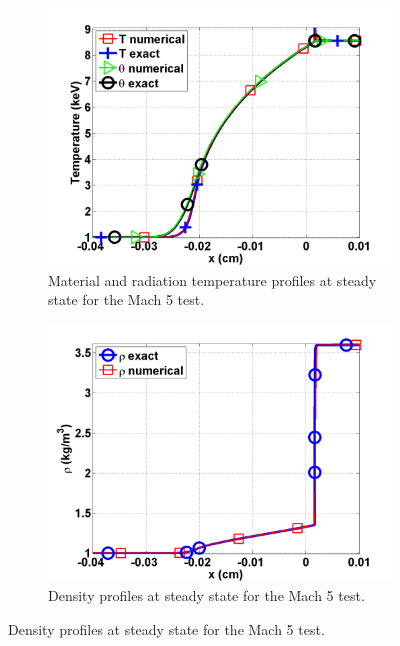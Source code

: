 \documentclass{mc2015}
\begin{document}
\begin{figure}[H]
\centering
\begin{subfigure}[b]{0.47\textwidth}
                \centering
                \includegraphics[width=\textwidth]{figs/Mach_5_nel_500_temperature.png}
        \caption{Material and radiation temperature profiles at steady state for the Mach 5 test.}\label{fig:Mach5_temp}
\end{subfigure}
\begin{subfigure}[b]{0.47\textwidth}
                \centering
                \includegraphics[width=\textwidth]{figs/Mach_5_nel_500_density.png}
        \caption{Density profiles at steady state for the Mach 5 test.}\label{fig:Mach5_dens}
\end{subfigure}

\end{figure}
\end{document}
